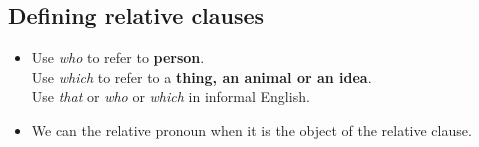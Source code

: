 \subsection{Defining relative clauses}
\begin{itemize}
    \item Use \textit{who} to refer to \textbf{person}.\\
    Use \textit{which} to refer to a \textbf{thing, an animal or an idea}.\\
    Use \textit{that} or \textit{who} or \textit{which} in informal English.
    \item We can  the relative pronoun when it is the object of the relative clause.
\end{itemize}